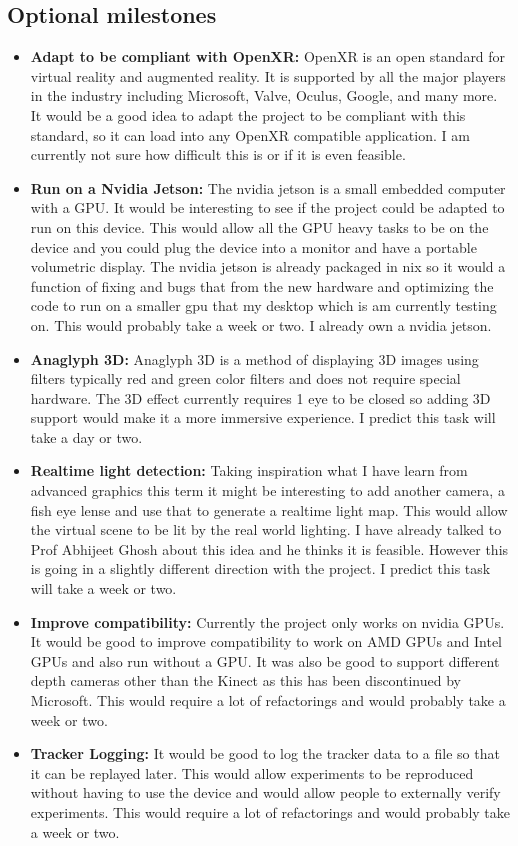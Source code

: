 \subsection{Optional milestones}
\begin{itemize}
    \item \textbf{Adapt to be compliant with OpenXR:} OpenXR is an open standard for virtual reality and augmented reality. It is supported by all the major players in the industry including Microsoft, Valve, Oculus, Google, and many more. It would be a good idea to adapt the project to be compliant with this standard, so it can load into any OpenXR compatible application. I am currently not sure how difficult this is or if it is even feasible.
 
    \item \textbf{Run on a Nvidia Jetson:} The nvidia jetson is a small embedded computer with a GPU. It would be interesting to see if the project could be adapted to run on this device. This would allow all the GPU heavy tasks to be on the device and you could plug the device into a monitor and have a portable volumetric display. The nvidia jetson is already packaged in nix so it would a function of fixing and bugs that from the new hardware and optimizing the code to run on a smaller gpu that my desktop which is am currently testing on. This would probably take a week or two. I already own a nvidia jetson.

    \item \textbf{Anaglyph 3D:} Anaglyph 3D is a method of displaying 3D images using filters typically red and green color filters and does not require special hardware. The 3D effect currently requires 1 eye to be closed so adding 3D support would make it a more immersive experience. I predict this task will take a day or two.
    
    \item \textbf{Realtime light detection:} Taking inspiration what I have learn from advanced graphics this term it might be interesting to add another camera, a fish eye lense and use that to generate a realtime light map. This would allow the virtual scene to be lit by the real world lighting. I have already talked to Prof Abhijeet Ghosh about this idea and he thinks it is feasible. However this is going in a slightly different direction with the project. I predict this task will take a week or two.
    
    \item \textbf{Improve compatibility:} Currently the project only works on nvidia GPUs. It would be good to improve compatibility to work on AMD GPUs and Intel GPUs and also run without a GPU. It was also be good to support different depth cameras other than the Kinect as this has been discontinued by Microsoft. This would require a lot of refactorings and would probably take a week or two.
    
    \item \textbf{Tracker Logging:} It would be good to log the tracker data to a file so that it can be replayed later. This would allow experiments to be reproduced without having to use the device and would allow people to externally verify experiments. This would require a lot of refactorings and would probably take a week or two.
\end{itemize}